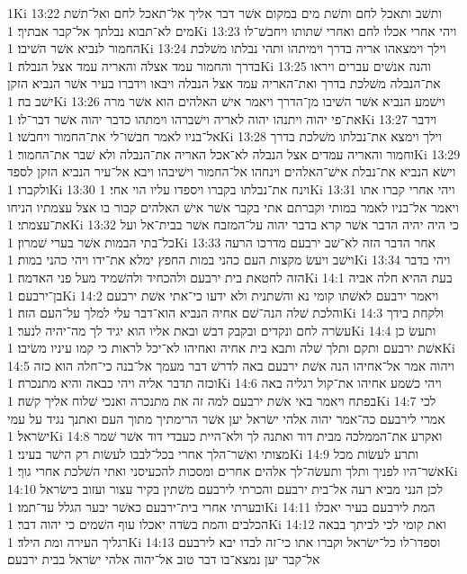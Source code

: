1Ki 13:22  ותשׁב ותאכל לחם ותשׁת מים במקום אשׁר דבר אליך אל־תאכל לחם ואל־תשׁת מים לא־תבוא נבלתך אל־קבר אבתיך׃
1Ki 13:23  ויהי אחרי אכלו לחם ואחרי שׁתותו ויחבשׁ־לו החמור לנביא אשׁר השׁיבו׃
1Ki 13:24  וילך וימצאהו אריה בדרך וימיתהו ותהי נבלתו משׁלכת בדרך והחמור עמד אצלה והאריה עמד אצל הנבלה׃
1Ki 13:25  והנה אנשׁים עברים ויראו את־הנבלה משׁלכת בדרך ואת־האריה עמד אצל הנבלה ויבאו וידברו בעיר אשׁר הנביא הזקן ישׁב בה׃
1Ki 13:26  וישׁמע הנביא אשׁר השׁיבו מן־הדרך ויאמר אישׁ האלהים הוא אשׁר מרה את־פי יהוה ויתנהו יהוה לאריה וישׁברהו וימתהו כדבר יהוה אשׁר דבר־לו׃
1Ki 13:27  וידבר אל־בניו לאמר חבשׁו־לי את־החמור ויחבשׁו׃
1Ki 13:28  וילך וימצא את־נבלתו משׁלכת בדרך וחמור והאריה עמדים אצל הנבלה לא־אכל האריה את־הנבלה ולא שׁבר את־החמור׃
1Ki 13:29  וישׂא הנביא את־נבלת אישׁ־האלהים וינחהו אל־החמור וישׁיבהו ויבא אל־עיר הנביא הזקן לספד ולקברו׃
1Ki 13:30  וינח את־נבלתו בקברו ויספדו עליו הוי אחי׃
1Ki 13:31  ויהי אחרי קברו אתו ויאמר אל־בניו לאמר במותי וקברתם אתי בקבר אשׁר אישׁ האלהים קבור בו אצל עצמתיו הניחו את־עצמתי׃
1Ki 13:32  כי היה יהיה הדבר אשׁר קרא בדבר יהוה על־המזבח אשׁר בבית־אל ועל כל־בתי הבמות אשׁר בערי שׁמרון׃
1Ki 13:33  אחר הדבר הזה לא־שׁב ירבעם מדרכו הרעה וישׁב ויעשׂ מקצות העם כהני במות החפץ ימלא את־ידו ויהי כהני במות׃
1Ki 13:34  ויהי בדבר הזה לחטאת בית ירבעם ולהכחיד ולהשׁמיד מעל פני האדמה׃
1Ki 14:1  בעת ההיא חלה אביה בן־ירבעם׃
1Ki 14:2  ויאמר ירבעם לאשׁתו קומי נא והשׁתנית ולא ידעו כי־אתי אשׁת ירבעם והלכת שׁלה הנה־שׁם אחיה הנביא הוא־דבר עלי למלך על־העם הזה׃
1Ki 14:3  ולקחת בידך עשׂרה לחם ונקדים ובקבק דבשׁ ובאת אליו הוא יגיד לך מה־יהיה לנער׃
1Ki 14:4  ותעשׂ כן אשׁת ירבעם ותקם ותלך שׁלה ותבא בית אחיה ואחיהו לא־יכל לראות כי קמו עיניו משׂיבו׃
1Ki 14:5  ויהוה אמר אל־אחיהו הנה אשׁת ירבעם באה לדרשׁ דבר מעמך אל־בנה כי־חלה הוא כזה וכזה תדבר אליה ויהי כבאה והיא מתנכרה׃
1Ki 14:6  ויהי כשׁמע אחיהו את־קול רגליה באה בפתח ויאמר באי אשׁת ירבעם למה זה את מתנכרה ואנכי שׁלוח אליך קשׁה׃
1Ki 14:7  לכי אמרי לירבעם כה־אמר יהוה אלהי ישׂראל יען אשׁר הרימתיך מתוך העם ואתנך נגיד על עמי ישׂראל׃
1Ki 14:8  ואקרע את־הממלכה מבית דוד ואתנה לך ולא־היית כעבדי דוד אשׁר שׁמר מצותי ואשׁר־הלך אחרי בכל־לבבו לעשׂות רק הישׁר בעיני׃
1Ki 14:9  ותרע לעשׂות מכל אשׁר־היו לפניך ותלך ותעשׂה־לך אלהים אחרים ומסכות להכעיסני ואתי השׁלכת אחרי גוך׃
1Ki 14:10  לכן הנני מביא רעה אל־בית ירבעם והכרתי לירבעם משׁתין בקיר עצור ועזוב בישׂראל ובערתי אחרי בית־ירבעם כאשׁר יבער הגלל עד־תמו׃
1Ki 14:11  המת לירבעם בעיר יאכלו הכלבים והמת בשׂדה יאכלו עוף השׁמים כי יהוה דבר׃
1Ki 14:12  ואת קומי לכי לביתך בבאה רגליך העירה ומת הילד׃
1Ki 14:13  וספדו־לו כל־ישׂראל וקברו אתו כי־זה לבדו יבא לירבעם אל־קבר יען נמצא־בו דבר טוב אל־יהוה אלהי ישׂראל בבית ירבעם׃
